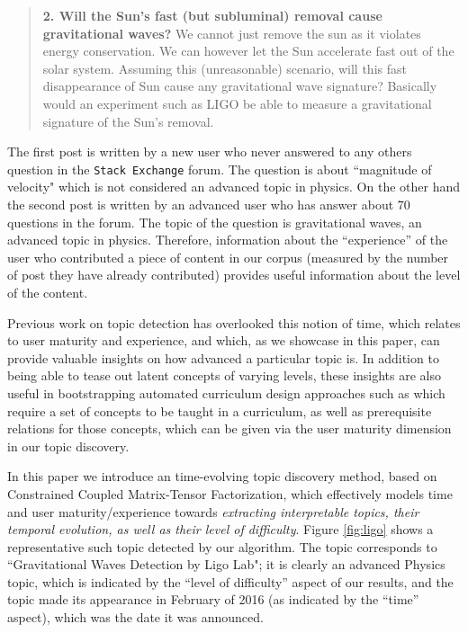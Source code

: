 \begin{quote}
\textbf{2. Will the Sun's fast (but subluminal) removal cause gravitational waves?}
 We cannot just remove the sun as it violates energy conservation. We can however let the Sun accelerate fast out of the solar system. Assuming this (unreasonable) scenario, will this fast disappearance of Sun cause any gravitational wave signature? Basically would an experiment such as LIGO be able to measure a gravitational signature of the Sun's removal. 
\end{quote}
The first post is written by a new user who never answered to any others question in the \texttt{Stack Exchange} forum. The question is about ``magnitude of velocity" which is not considered an advanced topic in physics. On the other hand the second post is written by an advanced user who has answer about 70 questions in the forum. The topic of the question is gravitational waves, an advanced topic in physics.
Therefore, information about the ``experience'' of the user who contributed a piece of content in our corpus (measured by the number of post they have already contributed) provides useful information about the level of the content.

Previous work on topic detection has overlooked this notion of time, which relates to user maturity and experience,  and which, as we showcase in this paper, can provide valuable insights on how advanced a particular topic is. In addition to being able to tease out latent concepts of varying levels, these insights are also useful in bootstrapping automated curriculum design approaches such as \cite{agrawal2016toward}  which require a set of concepts to be taught in a curriculum, as well as prerequisite relations for those concepts, which can be given via the user maturity dimension in our topic discovery.

In this paper we introduce an time-evolving topic discovery method, based on Constrained Coupled Matrix-Tensor Factorization, which effectively models time and user maturity/experience towards {\em extracting interpretable topics, their temporal evolution, as well as their level of difficulty}. Figure \ref{fig:ligo} shows a representative such topic detected by our algorithm. The topic corresponds to ``Gravitational Waves Detection by Ligo Lab"; it is clearly an advanced Physics topic, which is indicated by the ``level of difficulty'' aspect of our results, and the topic made its appearance in February of 2016 (as indicated by the ``time'' aspect), which was the date it was announced. 


